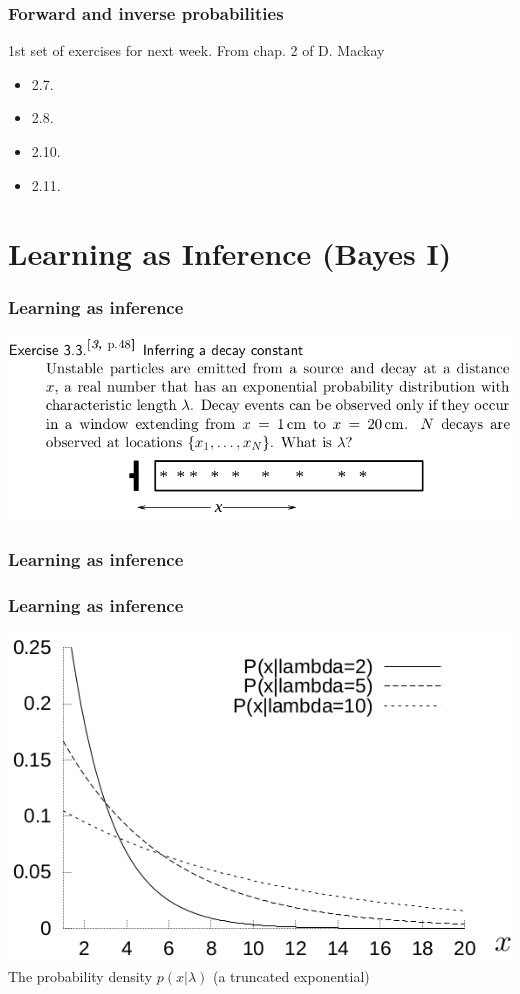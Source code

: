 \documentclass{beamer}
\begin{document}
\begin{frame}
	\frametitle{Forward and inverse probabilities}
	1st set of exercises for next week.
	From chap. 2 of D. Mackay
	\begin{itemize}
	\item 2.7.
	\item 2.8.
	\item 2.10.
	\item 2.11.
	\end{itemize}

\end{frame}

\section{Learning as Inference (Bayes I)}

\begin{frame}
	\frametitle{Learning as inference}
   \includegraphics[width=\textwidth]{e10}
\end{frame}


\begin{frame}
	\frametitle{Learning as inference}
\end{frame}


\begin{frame}
	\frametitle{Learning as inference}
   \includegraphics[width=.8\textwidth]{e11}\\
	The probability density $p(x|\lambda)$ (a truncated exponential)
\end{frame}
\end{document}
